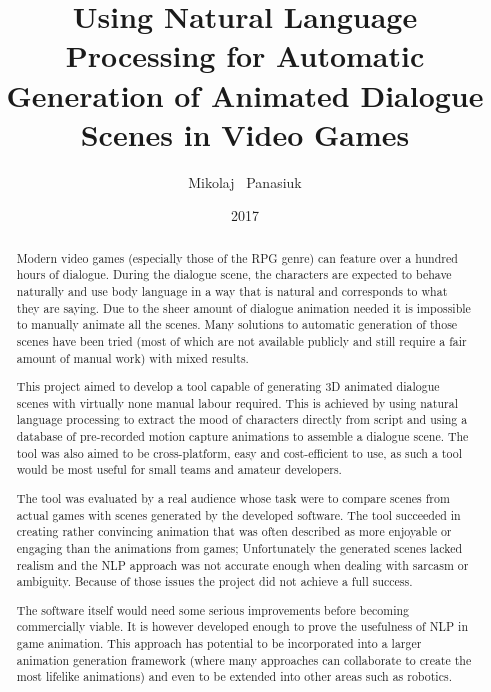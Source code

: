 \documentclass[phd]{abdnthesis}
\title{Using Natural Language Processing for Automatic Generation of Animated Dialogue Scenes in Video Games}
\author{Mikolaj \ Panasiuk}
\date{2017}
\begin{document}

\maketitle
\makedeclaration


\begin{abstract}
  Modern video games (especially those of the RPG genre) can feature over a hundred hours of dialogue. During the dialogue scene, the characters are expected to behave naturally and use body language in a way that is natural and corresponds to what they are saying. Due to the sheer amount of dialogue animation needed it is impossible to manually animate all the scenes. Many solutions to automatic generation of those scenes have been tried (most of which are not available publicly and still require a fair amount of manual work) with mixed results.
  
  This project aimed to develop a tool capable of generating 3D animated dialogue scenes with virtually none manual labour required. This is achieved by using natural language processing to extract the mood of characters directly from script and using a database of pre-recorded motion capture animations to assemble a dialogue scene. The tool was also aimed to be cross-platform, easy and cost-efficient to use, as such a tool would be most useful for small teams and amateur developers.
  
  The tool was evaluated by a real audience whose task were to compare scenes from actual games with scenes generated by the developed software. The tool succeeded in creating rather convincing animation that was often described as more enjoyable or engaging than the animations from games; Unfortunately the generated scenes lacked realism and the NLP approach was not accurate enough when dealing with sarcasm or ambiguity. Because of those issues the project did not achieve a full success.
  
  The software itself would need some serious improvements before becoming commercially viable. It is however developed enough to prove the usefulness of NLP in game animation. This approach has potential to be incorporated into a larger animation generation framework (where many approaches can collaborate to create the most lifelike animations) and even to be extended into other areas such as robotics. 
\end{abstract}
\end{document}
